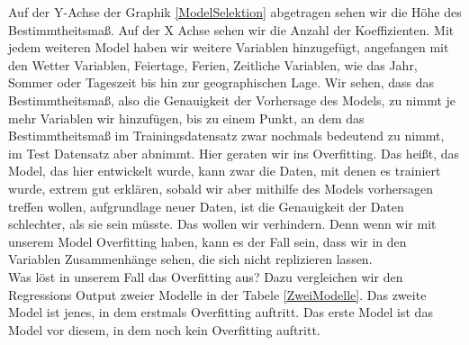 \documentclass[a4paper,12pt]{thesis}
\begin{document}
Auf der Y-Achse der Graphik \ref{ModelSelektion} abgetragen sehen wir die Höhe des Bestimmtheitsmaß. Auf der X Achse sehen wir die Anzahl der Koeffizienten. Mit jedem weiteren Model haben wir weitere Variablen hinzugefügt, angefangen mit den Wetter Variablen, Feiertage, Ferien, Zeitliche Variablen, wie das Jahr, Sommer oder Tageszeit bis hin zur geographischen Lage. Wir sehen, dass das Bestimmtheitsmaß, also die Genauigkeit der Vorhersage des Models, zu nimmt je mehr Variablen wir hinzufügen, bis zu einem Punkt, an dem das Bestimmtheitsmaß im Trainingsdatensatz zwar nochmals bedeutend zu nimmt, im Test Datensatz aber abnimmt. Hier geraten wir ins Overfitting. Das heißt, das Model, das hier entwickelt wurde, kann zwar die Daten, mit denen es trainiert wurde, extrem gut erklären, sobald wir aber mithilfe des Models vorhersagen treffen wollen, aufgrundlage neuer Daten, ist die Genauigkeit der Daten schlechter, als sie sein müsste. Das wollen wir verhindern. Denn wenn wir mit unserem Model Overfitting haben, kann es der Fall sein, dass wir in den Variablen Zusammenhänge sehen, die sich nicht replizieren lassen.\\

Was löst in unserem Fall das Overfitting aus? Dazu vergleichen wir den Regressions Output zweier Modelle in der Tabele \ref{ZweiModelle}. Das zweite Model ist jenes, in dem erstmals Overfitting auftritt. Das erste Model ist das Model vor diesem, in dem noch kein Overfitting auftritt.

	
\end{document}
